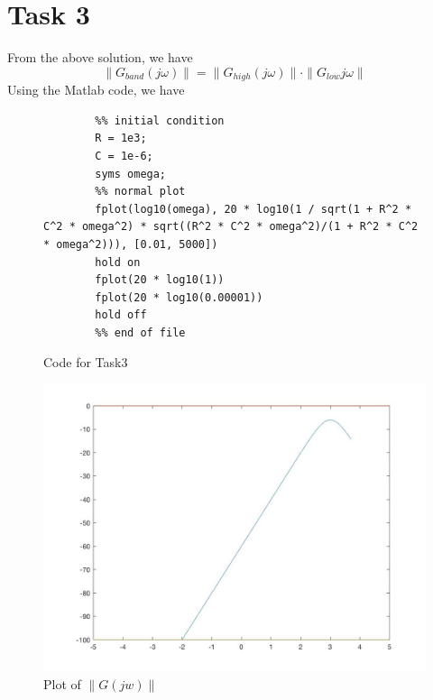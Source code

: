 \documentclass{article}
\begin{document}
\section*{Task 3}
From the above solution, we have
$$\|G_{band}(j \omega)\| = \|G_{high}(j \omega)\| \cdot \|G_{low}{j \omega} \| $$
Using the Matlab code, we have
\begin{figure}[H]
    \begin{verbatim}
        %% initial condition
        R = 1e3;
        C = 1e-6;
        syms omega;
        %% normal plot
        fplot(log10(omega), 20 * log10(1 / sqrt(1 + R^2 * C^2 * omega^2) * sqrt((R^2 * C^2 * omega^2)/(1 + R^2 * C^2 * omega^2))), [0.01, 5000])
        hold on
        fplot(20 * log10(1))
        fplot(20 * log10(0.00001))
        hold off
        %% end of file
\end{verbatim}
\caption{Code for Task3}
\end{figure}
\begin{figure}[H]
    \centering
    \includegraphics[width=\textwidth]{task3.jpg}
    \caption{Plot of $\| G(jw) \|$}
\end{figure}
\end{document}
